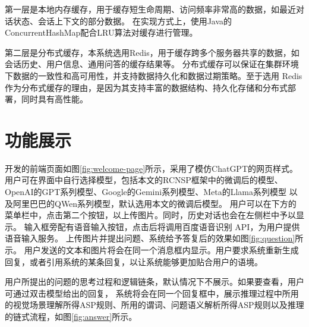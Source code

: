第一层是本地内存缓存，用于缓存短生命周期、访问频率非常高的数据，如最近对话状态、会话上下文的部分数据。
在实现方式上，使用Java的ConcurrentHashMap配合LRU算法对缓存进行管理。

第二层是分布式缓存，本系统选用Redis，用于缓存跨多个服务器共享的数据，如会话历史、用户信息、通用问答的缓存结果等。
分布式缓存可以保证在集群环境下数据的一致性和高可用性，并支持数据持久化和数据过期策略。至于选用
Redis作为分布式缓存的理由，是因为其支持丰富的数据结构、持久化存储和分布式部署，同时具有高性能。

\section{功能展示}
开发的前端页面如图\ref{fig:welcome-page}所示，采用了模仿ChatGPT的网页样式。
用户可在界面中自行选择模型，包括本文的RCNSP框架中的微调后的模型、OpenAI的GPT系列模型、Google的Gemini系列模型、Meta的Llama系列模型
以及阿里巴巴的QWen系列模型，默认选用本文的微调后模型。
用户可以在下方的菜单栏中，点击第二个按钮，以上传图片。同时，历史对话也会在左侧栏中予以显示。
输入框旁配有语音输入按钮，点击后将调用百度语音识别 API，为用户提供语音输入服务。
上传图片并提出问题、系统给予答复后的效果如图\ref{fig:question}所示。
用户发送的文本和图片将会在同一个消息框内显示。用户要求系统重新生成回复，或者引用系统的某条回复，以让系统能够更加贴合用户的语境。

用户所提出的问题的思考过程和逻辑链条，默认情况下不展示。如果要查看，用户可通过双击模型给出的回复，
系统将会在同一个回复框中，展示推理过程中所用的视觉场景理解所得ASP规则、所用的谓词、问题语义解析所得ASP规则以及推理的链式流程，如图\ref{fig:answer}所示。

